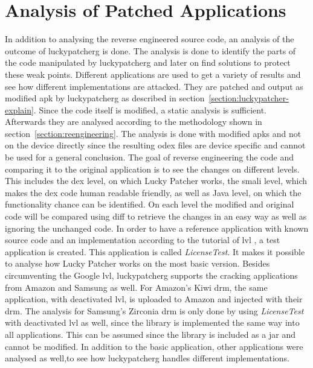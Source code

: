 \section{Analysis of Patched Applications} \label{section:luckypatcher-operation}
In addition to analysing the reverse engineered source code, an analysis of the outcome of \gls{luckypatcherg} is done.
The analysis is done to identify the parts of the code manipulated by \gls{luckypatcherg} and later on find solutions to protect these weak points.
Different applications are used to get a variety of results and see how different implementations are attacked.
They are patched and output as modified \gls{apk} by \gls{luckypatcherg} as described in section~\ref{section:luckypatcher-explain}.
Since the code itself is modified, a static analysis is sufficient.
Afterwards they are analysed according to the methodology shown in  section~\ref{section:reengineering}.
The analysis is done with modified \gls{apk}s and not on the device directly since the resulting \gls{odex} files are device specific and cannot be used for a general conclusion.
\newline
The goal of reverse engineering the code and comparing it to the original application is to see the changes on different levels.
This includes the \gls{dex} level, on which Lucky Patcher works, the smali level, which makes the \gls{dex} code human readable friendly, as well as Java level, on which the functionality chance can be identified.
On each level the modified and original code will be compared using diff to retrieve the changes in an easy way as well as ignoring the unchanged code.
\newline
In order to have a reference application with known source code and an implementation according to the tutorial of \gls{lvl} \cite{developersLicensingAdding}, a test application is created.
This application is called \textit{LicenseTest}.
It makes it possible to analyse how Lucky Patcher works on the most basic version.
Besides circumventing the Google \gls{lvl}, \gls{luckypatcherg} supports the cracking applications from Amazon and Samsung as well.
For Amazon's Kiwi \gls{drm}, the same application, with deactivated \gls{lvl}, is uploaded to Amazon and injected with their \gls{drm}.
The analysis for Samsung’s Zirconia \gls{drm} is only done by using \textit{LicenseTest} with deactivated \gls{lvl} as well, since the library is implemented the same way into all applications.
This can be assumed since the library is included as a \gls{jar} and cannot be modified.
In addition to the basic application, other applications were analysed as well,to see how \gls{luckypatcherg} handles different implementations.
